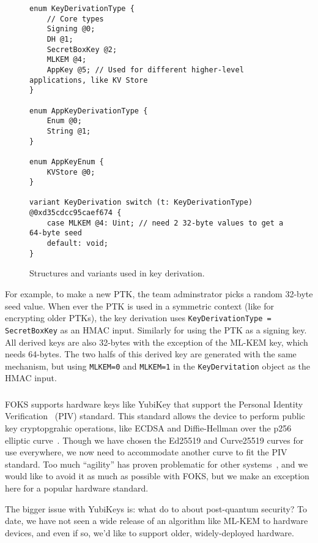 \begin{figure}[ht]
  \centering
  \begin{verbatim}
enum KeyDerivationType {
    // Core types
    Signing @0;
    DH @1;
    SecretBoxKey @2;
    MLKEM @4;
    AppKey @5; // Used for different higher-level applications, like KV Store
}

enum AppKeyDerivationType {
    Enum @0;
    String @1;
}

enum AppKeyEnum {
    KVStore @0;
}

variant KeyDerivation switch (t: KeyDerivationType) @0xd35cdcc95caef674 {
    case MLKEM @4: Uint; // need 2 32-byte values to get a 64-byte seed
    default: void;
}
\end{verbatim}
  \caption{Structures and variants used in key derivation.}
  \label{fig:key-derivation}
\end{figure}

For example, to make a new PTK, the team adminstrator picks a random 32-byte
seed value.  When ever the PTK is used in a symmetric context (like for
encrypting older PTKs), the key derivation uses \texttt{KeyDerivationType =
SecretBoxKey} as an HMAC input.  Similarly for using the PTK as a signing key.
All derived keys are also 32-bytes with the exception of the ML-KEM key, which
needs 64-bytes. The two halfs of this derived key are generated with the same
mechanism, but using \texttt{MLKEM=0} and \texttt{MLKEM=1} in the
\texttt{KeyDervitation} object as the HMAC input.

\subsubsection{\Yubis}

FOKS supports hardware keys like YubiKey that support the Personal Identity
Verification~\cite{nist-sp-800-73-5} (PIV) standard.  This standard allows the
device to perform public key cryptopgrahic operations, like ECDSA and
Diffie-Hellman over the p256 elliptic curve~\cite{nist-fips-186-3}. Though we
have chosen the Ed25519 and Curve25519 curves for use everywhere, we now need to
accommodate another curve to fit the PIV standard. Too much ``agility'' has
proven problematic for other systems~\cite{jwt-none}, and we would like to avoid
it as much as possible with FOKS, but we make an exception here for a popular
hardware standard.

The bigger issue with YubiKeys is: what do to about post-quantum security?  To
date, we have not seen a wide release of an algorithm like ML-KEM to hardware
devices, and even if so, we'd like to support older, widely-deployed hardware. 


